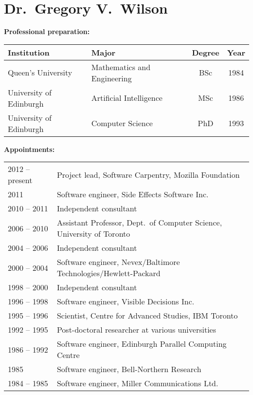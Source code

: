 \documentclass{proposalnsf}
\begin{document}
{}
\renewcommand{\thepage} {\footnotesize Bio.\,---\,\arabic{page}}
\section*{Dr.\ Gregory V.\ Wilson}

\small
\textbf{Professional preparation:} 

\begin{tabular}{llcc}
Institution & Major & Degree & Year \\ \hline
Queen's University & Mathematics and Engineering & BSc & 1984 \\
University of Edinburgh & Artificial Intelligence & MSc & 1986 \\
University of Edinburgh & Computer Science & PhD & 1993 \\
\end{tabular}

\textbf{Appointments:} 

\begin{tabular}{ll}
2012 -- present &  Project lead, Software Carpentry, Mozilla Foundation \\
2011         &  Software engineer, Side Effects Software Inc. \\
2010 -- 2011 &  Independent consultant \\
2006 -- 2010 &  Assistant Professor, Dept.\ of Computer Science, University of Toronto \\
2004 -- 2006 &  Independent consultant \\
2000 -- 2004 &  Software engineer, Nevex/Baltimore Technologies/Hewlett-Packard \\
1998 -- 2000 &  Independent consultant \\
1996 -- 1998 &  Software engineer, Visible Decisions Inc. \\
1995 -- 1996 &  Scientist, Centre for Advanced Studies, IBM Toronto \\
1992 -- 1995 &  Post-doctoral researcher at various universities \\
1986 -- 1992 &  Software engineer, Edinburgh Parallel Computing Centre \\
1985         &  Software engineer, Bell-Northern Research \\
1984 -- 1985 &  Software engineer, Miller Communications Ltd. \\
\end{tabular}
\end{document}
